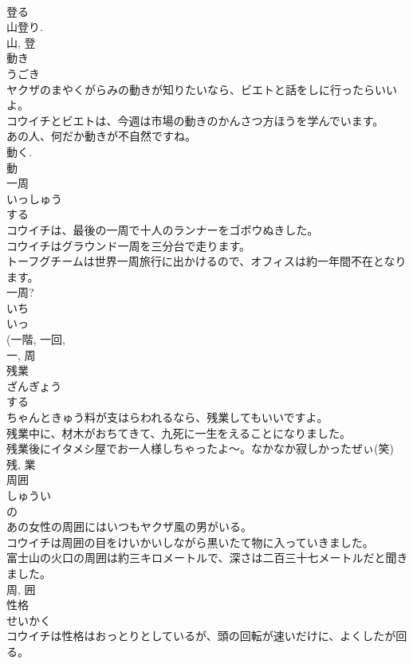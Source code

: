 \documentclass[8pt]{extreport}
\begin{document}
\begin{CJK}{UTF8}{min}
\\	登る 
\\	山登り. 
\\	山, 登	
\\	動き	
\\	うごき	
\\	ヤクザのまやくがらみの動きが知りたいなら、ビエトと話をしに行ったらいいよ。	
\\	コウイチとビエトは、今週は市場の動きのかんさつ方ほうを学んでいます。	
\\	あの人、何だか動きが不自然ですね。	
\\	動く. 
\\	動	
\\	一周	
\\	いっしゅう	
\\	する 
\\	コウイチは、最後の一周で十人のランナーをゴボウぬきした。	
\\	コウイチはグラウンド一周を三分台で走ります。	
\\	トーフグチームは世界一周旅行に出かけるので、オフィスは約一年間不在となります。	
\\	一周?	
\\	いち 
\\	いっ 
\\	(一階, 一回, 
\\	一, 周	
\\	残業	
\\	ざんぎょう	
\\	する 
\\	ちゃんときゅう料が支はらわれるなら、残業してもいいですよ。	
\\	残業中に、材木がおちてきて、九死に一生をえることになりました。	
\\	残業後にイタメシ屋でお一人様しちゃったよ〜。なかなか寂しかったぜぃ(笑)	
\\	残, 業	
\\	周囲	
\\	しゅうい	
\\	の 
\\	あの女性の周囲にはいつもヤクザ風の男がいる。	
\\	コウイチは周囲の目をけいかいしながら黒いたて物に入っていきました。	
\\	富士山の火口の周囲は約三キロメートルで、深さは二百三十七メートルだと聞きました。	
\\	周, 囲	
\\	性格	
\\	せいかく	
\\	コウイチは性格はおっとりとしているが、頭の回転が速いだけに、よくしたが回る。	

\end{CJK}
\end{document}
